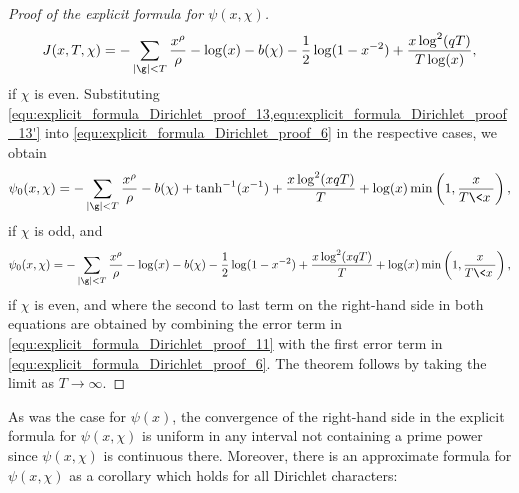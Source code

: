 \begin{proof}[Proof of the explicit formula for $\psi(x,\chi)$]
\begin{equation}
          J(x,T,\chi) = -\sum_{|\g| < T}\frac{x^{\rho}}{\rho}-\log(x)-b(\chi)-\frac{1}{2}\log(1-x^{-2})+\frac{x\log^{2}(qT)}{T\log(x)},
        \end{equation}
        if $\chi$ is even.
        Substituting \cref{equ:explicit_formula_Dirichlet_proof_13,equ:explicit_formula_Dirichlet_proof_13'} into \cref{equ:explicit_formula_Dirichlet_proof_6} in the respective cases, we obtain
        \begin{equation}\label{equ:explicit_formula_Dirichlet_proof_14}
          \psi_{0}(x,\chi) = -\sum_{|\g| < T}\frac{x^{\rho}}{\rho}-b(\chi)+\tanh^{-1}(x^{-1})+\frac{x\log^{2}(xqT)}{T}+\log(x)\min\left(1,\frac{x}{T\<x\>}\right),
        \end{equation}
        if $\chi$ is odd, and
        \begin{equation}\label{equ:explicit_formula_Dirichlet_proof_14'}
          \psi_{0}(x,\chi) = -\sum_{|\g| < T}\frac{x^{\rho}}{\rho}-\log(x)-b(\chi)-\frac{1}{2}\log(1-x^{-2})+\frac{x\log^{2}(xqT)}{T}+\log(x)\min\left(1,\frac{x}{T\<x\>}\right),
        \end{equation}
        if $\chi$ is even, and where the second to last term on the right-hand side in both equations are obtained by combining the error term in \cref{equ:explicit_formula_Dirichlet_proof_11} with the first error term in \cref{equ:explicit_formula_Dirichlet_proof_6}. The theorem follows by taking the limit as $T \to \infty$.
      \end{proof}

      As was the case for $\psi(x)$, the convergence of the right-hand side in the explicit formula for $\psi(x,\chi)$ is uniform in any interval not containing a prime power since $\psi(x,\chi)$ is continuous there. Moreover, there is an approximate formula for $\psi(x,\chi)$ as a corollary which holds for all Dirichlet characters:



